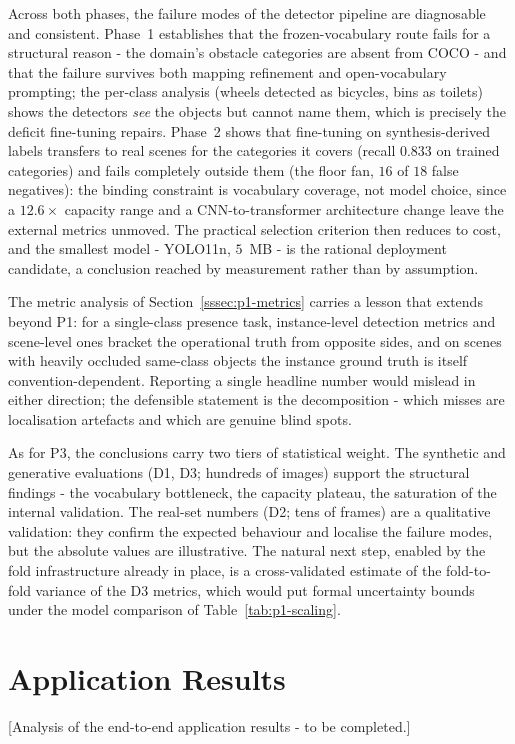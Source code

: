 Across both phases, the failure modes of the detector pipeline are diagnosable
and consistent. Phase~1 establishes that the frozen-vocabulary route fails for
a structural reason - the domain's obstacle categories are absent from COCO -
and that the failure survives both mapping refinement and open-vocabulary
prompting; the per-class analysis (wheels detected as bicycles, bins as
toilets) shows the detectors \emph{see} the objects but cannot name them,
which is precisely the deficit fine-tuning repairs. Phase~2 shows that
fine-tuning on synthesis-derived labels transfers to real scenes for the
categories it covers (recall $0.833$ on trained categories) and fails
completely outside them (the floor fan, $16$ of $18$ false negatives): the
binding constraint is vocabulary coverage, not model choice, since a
$12.6\times$ capacity range and a CNN-to-transformer architecture change leave
the external metrics unmoved. The practical selection criterion then reduces
to cost, and the smallest model - YOLO11n, $5$~MB - is the rational deployment
candidate, a conclusion reached by measurement rather than by assumption.

The metric analysis of Section~\ref{sssec:p1-metrics} carries a lesson that
extends beyond P1: for a single-class presence task, instance-level detection
metrics and scene-level ones bracket the operational truth from opposite
sides, and on scenes with heavily occluded same-class objects the instance
ground truth is itself convention-dependent. Reporting a single headline
number would mislead in either direction; the defensible statement is the
decomposition - which misses are localisation artefacts and which are genuine
blind spots.

As for P3, the conclusions carry two tiers of statistical weight. The
synthetic and generative evaluations (D1, D3; hundreds of images) support the
structural findings - the vocabulary bottleneck, the capacity plateau, the
saturation of the internal validation. The real-set numbers (D2; tens of
frames) are a qualitative validation: they confirm the expected behaviour and
localise the failure modes, but the absolute values are illustrative. The
natural next step, enabled by the fold infrastructure already in place, is a
cross-validated estimate of the fold-to-fold variance of the D3 metrics, which
would put formal uncertainty bounds under the model comparison of
Table~\ref{tab:p1-scaling}.

\section{Application Results}

[Analysis of the end-to-end application results - to be completed.]
